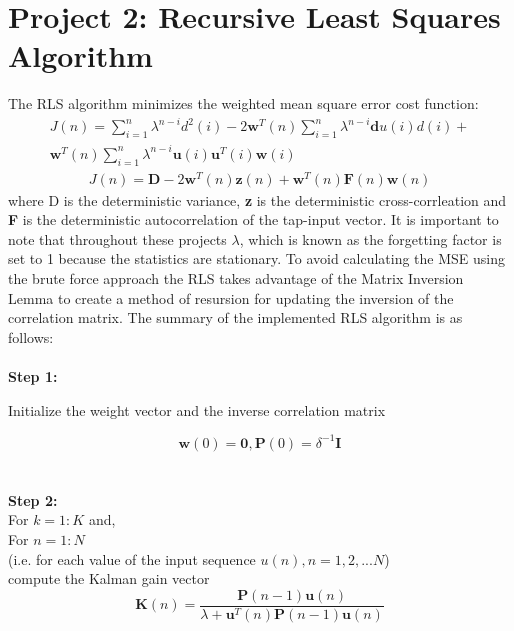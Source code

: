 \documentclass[journal]{IEEEtran}
\begin{document}
\section{Project 2: Recursive Least Squares Algorithm}
The RLS algorithm minimizes the weighted mean square error cost function:
\begin{align*}
  J(n)=\sum_{i=1}^{n}\lambda^{n-i}d^2(i)-2\boldsymbol{w}^T(n)\sum_{i=1}^{n}\lambda^{n-i}\boldsymbol{d}{u}(i)d(i)+ \\ \boldsymbol{w}^T(n)\sum_{i=1}^{n}\lambda^{n-i}\boldsymbol{u}(i)\boldsymbol{u}^T(i)\boldsymbol{w}(i)
\end{align*}
\begin{align*}
  J(n)= \boldsymbol{D} - 2\boldsymbol{w}^T(n)\boldsymbol{z}(n)+\boldsymbol{w}^T(n)\boldsymbol{F}(n)\boldsymbol{w}(n)
\end{align*}
where D is the deterministic variance, \textbf{z} is the deterministic cross-corrleation and \textbf{F}
is the deterministic autocorrelation of the tap-input vector. It is important to note that throughout these projects $\lambda$,
which is known as the forgetting factor is set to 1 because the statistics are stationary. To avoid calculating the MSE using the brute force
approach the RLS takes advantage of the Matrix Inversion Lemma to create a method of resursion for updating the inversion of the correlation matrix.
The summary of the implemented RLS algorithm is as follows:\\
\\
\textbf{Step 1:} \\ \vspace{-5mm}
\begin{center} Initialize the weight vector and the inverse correlation matrix\end{center}
$$\boldsymbol{w}(0) = \boldsymbol{0},  \boldsymbol{P}(0) = \delta^{-1}\boldsymbol{I}$$\\
\vspace{-7mm}\\\textbf{Step 2:}\\
For $k = 1:K$ and,\\
For $n = 1:N$\\
(i.e. for each value of the input sequence $u(n), n = 1,2,...N$)
\\ compute the Kalman gain vector
\begin{equation}
  \boldsymbol{K}(n)= \dfrac{\boldsymbol{P}(n-1)\boldsymbol{u}(n)}{\lambda+\boldsymbol{u}^T(n)\boldsymbol{P}(n-1)\boldsymbol{u}(n)}
\end{equation}
\end{document}
